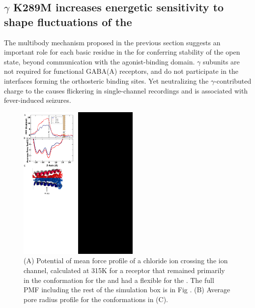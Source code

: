 \documentclass[9pt,twocolumn,twoside,lineno]{pnas-new}
\begin{document}
\subsection*{$\gamma$ K289M increases energetic sensitivity to shape fluctuations of the \fiveringnos} The multibody mechanism proposed in the previous section suggests an important role for each basic residue in the \fivering for conferring stability of the open state, beyond communication with the agonist-binding domain.  $\gamma$ subunits are not required for functional GABA(A) receptors, and do not participate in the interfaces forming the orthosteric binding sites. %
Yet neutralizing the $\gamma$-contributed charge to the \fivering causes flickering in single-channel recordings \cite{Bianchi2002}  and is associated with fever-induced seizures. %

\begin{figure}[t]
\centering
\includegraphics[height = 3in]{figures_2/pillar_4_ABF_2}
\caption{ (A) Potential of mean force profile of a chloride ion crossing the ion channel, calculated at 315K for a receptor that remained primarily in the \extended conformation for the \WT and had a flexible \fivering for the \MT. The full PMF including the rest of the simulation box is in Fig \SFullABF. (B) Average pore radius profile for the conformations in (C).}
\label{fig:abf}\label{fig:pore-profile}
\end{figure}
\end{document}
